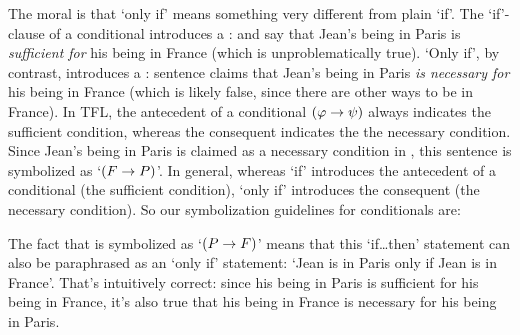 The moral is that `only if' means something very different from plain `if'.  The `if'-clause of a conditional introduces a :  and  say that Jean's being in Paris is \emph{sufficient for} his being in France (which is unproblematically true).  `Only if', by contrast, introduces a : sentence  claims that Jean's being in Paris \emph{is necessary for} his being in France (which is likely false, since there are other ways to be in France). In TFL, the antecedent \meta{\varphi} of a conditional $(\mathcal{\varphi} \rightarrow \mathcal{\psi})$ always indicates the sufficient condition, whereas the consequent \meta{\psi} indicates the the necessary condition.  Since Jean's being in Paris is claimed as a necessary condition in , this sentence is symbolized as `$(F \rightarrow P)$'.  In general, whereas `if' introduces the antecedent of a conditional (the sufficient condition), `only if' introduces the consequent (the necessary condition).  So our symbolization guidelines for conditionals are:


The fact that  is symbolized as `$(P \rightarrow F)$' means that this `if\ldots then' statement can also be paraphrased as an `only if' statement: `Jean is in Paris only if Jean is in France'.  That's intuitively correct: since his being in Paris is sufficient for his being in France, it's also true that his being in France is necessary for his being in Paris.

